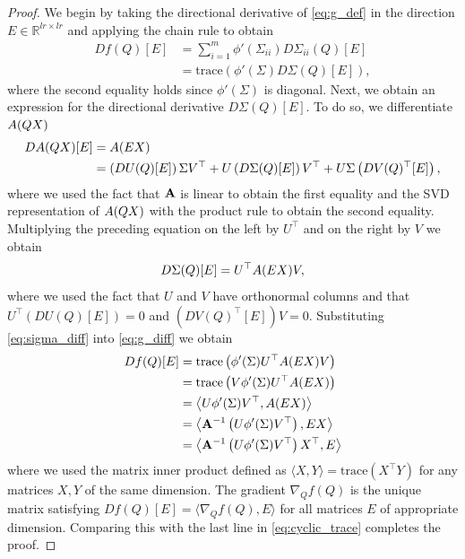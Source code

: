 \documentclass[10pt,a4paper]{amsart}
\newcommand{\bfA}[1]{{\textbf A}(#1)}
\begin{document}
\begin{proof}
   We begin by taking the directional derivative of \eqref{eq:g_def} in the direction $E \in \mathbb{R}^{lr \times lr}$ and applying the chain rule to obtain 
   \begin{equation} \label{eq:g_diff}
   \begin{aligned}
       Df(Q)[E] &= \sum_{i=1}^m \phi'\left(\Sigma_{ii}\right) D\Sigma_{ii}(Q)[E] \\
       &= \mbox{trace}\left(\phi'(\Sigma) D \Sigma(Q)[E]\right), 
   \end{aligned}
   \end{equation}
   where the second equality holds since $\phi'(\Sigma)$ is diagonal. 
   Next, we obtain an expression for the directional derivative $D\Sigma(Q)[E]$. To do so, we differentiate $\bfA{QX}$ 
   \begin{equation}
   \begin{aligned}
       D \bfA{QX}[E] &= \bfA{EX} \\
       &= \left(DU(Q)[E]\right) \Sigma V^{\top} + U \left(D\Sigma(Q)[E]\right) V^{\top} + U\Sigma \left(DV(Q)^{\top}[E]\right),
    \end{aligned}
   \end{equation}
   where we used the fact that ${\bf A}$ is linear to obtain the first equality and the SVD representation of $\bfA{QX}$ with the product rule to obtain the second equality. Multiplying the preceding equation on the left by $U^{\top}$ and on the right by $V$ we obtain 
   \begin{equation} \label{eq:sigma_diff}
    D \Sigma(Q)[E] = U^{\top} \bfA{EX} V,
   \end{equation}
   where we used the fact that $U$ and $V$ have orthonormal columns and that $U^{\top}\left(DU(Q)[E]\right) =0$ and $\left(DV(Q)^{\top}[E]\right)V=0$. 
   Substituting \eqref{eq:sigma_diff} into \eqref{eq:g_diff} we obtain 
   \begin{equation} \label{eq:cyclic_trace}
   \begin{aligned}
       Df(Q)[E] &= \mbox{trace}\left(\phi'(\Sigma) U^{\top} \bfA{EX}V\right) \\
       &= \mbox{trace}\left(V \phi'(\Sigma) U^{\top} \bfA{EX}\right) \\
       &= \left\langle U\phi'(\Sigma)V^{\top}, \bfA{EX} \right\rangle \\
       &= \left\langle {\bf A}^{-1}\left( U\phi'(\Sigma)V^{\top}\right), EX \right\rangle \\
       &= \left\langle {\bf A}^{-1}\left( U\phi'(\Sigma)V^{\top}\right)X^{\top}, E \right\rangle
    \end{aligned}
   \end{equation}
   where we used the matrix inner product defined as $\langle X,Y\rangle=\mbox{trace}(X^{\top}Y)$ for any matrices $X,Y$ of the same dimension. The gradient $\nabla_Q f(Q)$ is the unique matrix satisfying $Df(Q)[E] = \langle \nabla_Q f(Q),E\rangle$ for all matrices $E$ of appropriate dimension. Comparing this with the last line in \eqref{eq:cyclic_trace} completes the proof. 
\end{proof}
\end{document}

